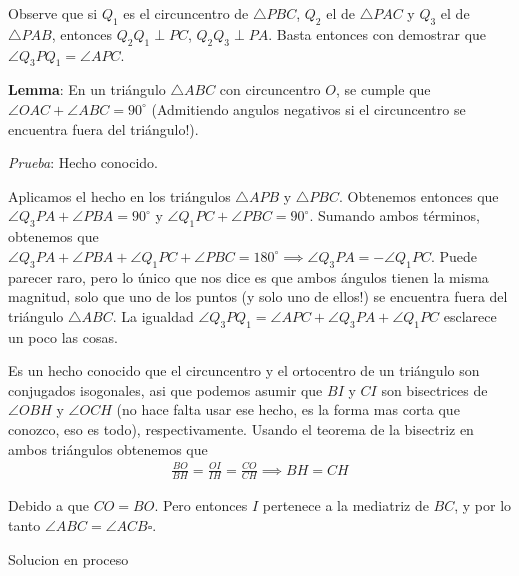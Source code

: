 \begin{sol}
	Observe que si $Q_{1}$ es el circuncentro de $\triangle PBC$, $Q_{2}$ el de $\triangle PAC$ y $Q_{3}$ el de $\triangle PAB$, entonces $Q_{2}Q_{1} \perp PC $, $Q_{2}Q_{3} \perp PA$. Basta entonces con demostrar que $\angle Q_{3}PQ_{1} = \angle APC$.
	
	\textbf{Lemma}: En un tri\'angulo $\triangle ABC$ con circuncentro $O$, se cumple que $\angle OAC + \angle ABC = 90^{\circ}$ (Admitiendo angulos negativos si el circuncentro se encuentra fuera del tri\'angulo!).
	
	\textit{Prueba}: Hecho conocido.
	
	Aplicamos el hecho en los tri\'angulos $\triangle APB $ y $\triangle PBC$. Obtenemos entonces que $\angle Q_{3}PA + \angle PBA = 90^{\circ}$ y $\angle Q_{1}PC + \angle PBC = 90^{\circ}$. Sumando ambos t\'erminos, obtenemos que $\angle Q_{3}PA + \angle PBA  + \angle Q_{1}PC + \angle PBC = 180^{\circ} \implies \angle Q_{3}PA = -\angle Q_{1}PC$. Puede parecer raro, pero lo \'unico que nos dice es que ambos \'angulos tienen la misma magnitud, solo que uno de los puntos (y solo uno de ellos!) se encuentra fuera del tri\'angulo $\triangle ABC$. La igualdad $\angle Q_{3}PQ_{1} = \angle APC + \angle Q_{3}PA + \angle Q_{1}PC$ esclarece un poco las cosas.
	
\end{sol}

\begin{sol}
	

		Es un hecho conocido que el circuncentro y el ortocentro de un tri\'angulo son conjugados isogonales, asi que podemos asumir que $BI$ y $CI$ son bisectrices de $\angle OBH$ y $\angle OCH$ (no hace falta usar ese hecho, es la forma mas corta que conozco, eso es todo), respectivamente. Usando el teorema de la bisectriz en ambos tri\'angulos obtenemos que
		\begin{align}
		\frac{BO}{BH} = \frac{OI}{IH} = \frac{CO}{CH} \implies BH = CH
		\end{align}
		
		Debido a que $CO = BO$. Pero entonces $I$ pertenece a la mediatriz de $BC$, y por lo tanto $\angle ABC = \angle ACB\square$.

\end{sol}

\begin{sol}
	Solucion en proceso
\end{sol}

